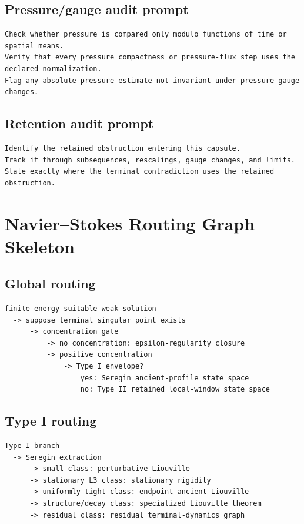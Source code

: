 \documentclass[11pt]{article}
\theoremstyle{plain}
\theoremstyle{definition}
\theoremstyle{remark}
\begin{document}
\subsection{Pressure/gauge audit prompt}
\begin{lstlisting}
Check whether pressure is compared only modulo functions of time or spatial means.
Verify that every pressure compactness or pressure-flux step uses the declared normalization.
Flag any absolute pressure estimate not invariant under pressure gauge changes.
\end{lstlisting}

\subsection{Retention audit prompt}
\begin{lstlisting}
Identify the retained obstruction entering this capsule.
Track it through subsequences, rescalings, gauge changes, and limits.
State exactly where the terminal contradiction uses the retained obstruction.
\end{lstlisting}

\section{Navier--Stokes Routing Graph Skeleton}
\label{app:ns-routing-graph}

\subsection{Global routing}
\begin{lstlisting}
finite-energy suitable weak solution
  -> suppose terminal singular point exists
      -> concentration gate
          -> no concentration: epsilon-regularity closure
          -> positive concentration
              -> Type I envelope?
                  yes: Seregin ancient-profile state space
                  no: Type II retained local-window state space
\end{lstlisting}

\subsection{Type I routing}
\begin{lstlisting}
Type I branch
  -> Seregin extraction
      -> small class: perturbative Liouville
      -> stationary L3 class: stationary rigidity
      -> uniformly tight class: endpoint ancient Liouville
      -> structure/decay class: specialized Liouville theorem
      -> residual class: residual terminal-dynamics graph
\end{lstlisting}
\end{document}
